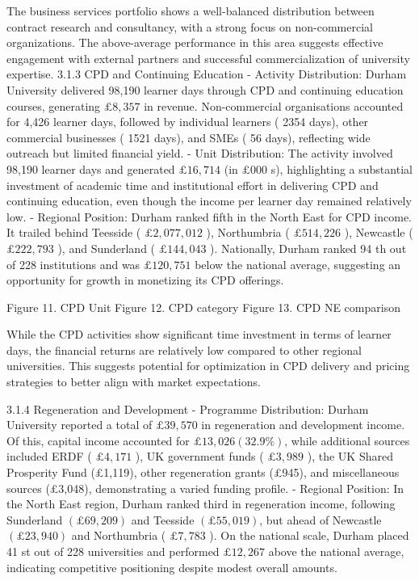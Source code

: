 The business services portfolio shows a well-balanced distribution between contract research and consultancy, with a strong focus on non-commercial organizations. The above-average performance in this area suggests effective engagement with external partners and successful commercialization of university expertise.
3.1.3 CPD and Continuing Education
- Activity Distribution: Durham University delivered 98,190 learner days through CPD and continuing education courses, generating $£ 8,357$ in revenue. Non-commercial organisations accounted for 4,426 learner days, followed by individual learners ( 2354 days), other commercial businesses ( 1521 days), and SMEs ( 56 days), reflecting wide outreach but limited financial yield.
- Unit Distribution: The activity involved 98,190 learner days and generated $£ 16,714$ (in $£ 000$ s), highlighting a substantial investment of academic time and institutional effort in delivering CPD and continuing education, even though the income per learner day remained relatively low.
- Regional Position: Durham ranked fifth in the North East for CPD income. It trailed behind Teesside ( $£ 2,077,012$ ), Northumbria ( $£ 514,226$ ), Newcastle ( $£ 222,793$ ), and Sunderland ( $£ 144,043$ ). Nationally, Durham ranked 94 th out of 228 institutions and was $£ 120,751$ below the national average, suggesting an opportunity for growth in monetizing its CPD offerings.

Figure 11. CPD Unit 
Figure 12. CPD category
Figure 13. CPD NE comparison

While the CPD activities show significant time investment in terms of learner days, the financial returns are relatively low compared to other regional universities. This suggests potential for optimization in CPD delivery and pricing strategies to better align with market expectations.

3.1.4 Regeneration and Development
- Programme Distribution: Durham University reported a total of $£ 39,570$ in regeneration and development income. Of this, capital income accounted for $£ 13,026(32.9 \%)$, while additional sources included ERDF ( $£ 4,171$ ), UK government funds ( $£ 3,989$ ), the UK Shared Prosperity Fund (£1,119), other regeneration grants (£945), and miscellaneous sources (£3,048), demonstrating a varied funding profile.
- Regional Position: In the North East region, Durham ranked third in regeneration income, following Sunderland $(£ 69,209)$ and Teesside $(£ 55,019)$, but ahead of Newcastle $(£ 23,940)$ and Northumbria ( $£ 7,783$ ). On the national scale, Durham placed 41 st out of 228 universities and performed $£ 12,267$ above the national average, indicating competitive positioning despite modest overall amounts.

